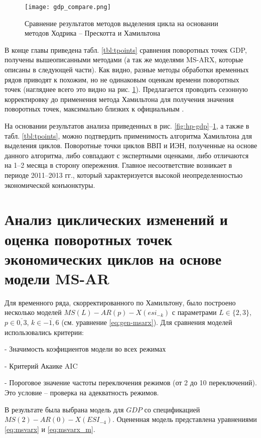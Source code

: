 \documentclass[../report.tex]{subfiles}
\begin{document}
	
	\begin{figure}
		\label{fig:gdp_compare}
		\texttt{[image: gdp\_compare.png]}
		\caption{Сравнение результатов методов выделения цикла на основании 
			методов Ходрика – Прескотта и Хамильтона}	
	\end{figure}
	
	В конце главы приведена табл. \ref{tbl:tpoints} сравнения поворотных точек GDP, получены вышеописанными методами (а так же моделями MS-ARX, которые описаны в следующей части). Как видно, разные методы обработки временных рядов приводят к похожим, но не одинаковым оценкам времени поворотных точек (нагляднее всего это видно на рис. \ref{fig:gdp_compare}). Предлагается проводить сезонную корректировку до применения метода Хамильтона для получения значения поворотных точек, максимально близких к официальным \cite{makarevich_hse_paper,makarevich_bsu_conf_2017}.
	
	На основании результатов анализа приведенных в рис. \ref{fig:hp-gdp}–\ref{fig:gdp_compare}, а также в табл. \ref{tbl:tpoints}, можно подтвердить применимость алгоритма Хамильтона для выделения циклов. Поворотные точки циклов ВВП и ИЭН, полученные на основе данного алгоритма, либо совпадают с экспертными оценками, либо отличаются на 1–2 месяца в сторону опережения. Главное несоответствие  возникает в периоде 2011–2013 гг., который характеризуется высокой неопределенностью экономической конъюнктуры.
	
	
	\section{Анализ циклических изменений и оценка поворотных точек экономических циклов на основе модели MS-AR}
	
	Для временного ряда, скорректированного по Хамильтону, было построено несколько моделей $MS(L)-AR(p)-X(esi_{-k})$ с параметрами $L \in \{2,3\}$, $p \in \overline{0,3}$, $k \in \overline{-1,6}$ (см. уравнение \ref{eq:gen-msarx}). Для сравнения моделей использовались критерии:
	
	- Значимость коэфициентов модели во всех режимах
	
	- Критерий Акаике AIC
	
	- Пороговое значение частоты переключения режимов (от 2 до 10 переключений). Это условие – проверка на адекватность режимов.
	
	В результате была выбрана модель для ${GDP}$ со спецификацией $MS(2)-AR(0)-X({ESI}_{-4})$. Оцененная модель представлена уравнениями \ref{eq:msvarx} и \ref{eq:msvarx_m}.
	
\end{document}
